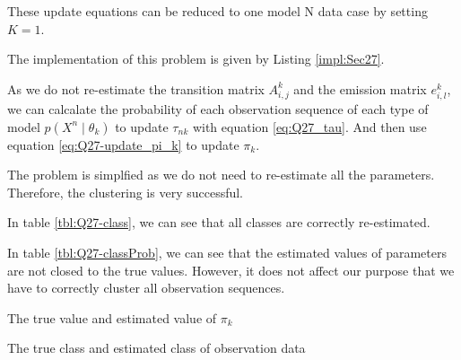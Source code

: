 \documentclass[12pt]{article}
\newenvironment{problem}[2][Problem]{\begin{trivlist}
\item[\hskip \labelsep {\bfseries #1}\hskip \labelsep {\bfseries #2.}]}{\end{trivlist}}
\begin{document}
\begin{problem}{2.7.21}
These update equations can be reduced to one model N data case by setting $K = 1$.
\end{problem}

\begin{problem}{2.7.22}
The implementation of this problem is given by Listing \ref{impl:Sec27}.

As we do not re-estimate the transition matrix $A^{k}_{i,j}$ and the emission
matrix $e^{k}_{i,l}$, we can calcalate the probability of each observation sequence of 
each type of model $p(X^n \mid \theta_k)$ to update $\tau_{nk}$ with equation
\eqref{eq:Q27_tau}. And then use equation \eqref{eq:Q27-update_pi_k} to update $\pi_k$.
\end{problem}

\begin{problem}{2.7.23}
The problem is simplfied as we do not need to re-estimate all the
parameters. Therefore, the clustering is very successful. 

In table \ref{tbl:Q27-class},
we can see that all classes are correctly re-estimated. 

In table \ref{tbl:Q27-classProb},
we can see that the estimated values of parameters are not closed to the true values.
However, it does not affect our purpose that we have to correctly cluster all observation
sequences.

\begin{table}
    \centering
    \caption{The true value and estimated value of $\pi_k$}\label{tbl:Q27-classProb}
\end{table}

\begin{table}
    \centering
    \caption{The true class and estimated class of observation data}\label{tbl:Q27-class}
\end{table}
\end{problem}
\pagebreak
\end{document}
